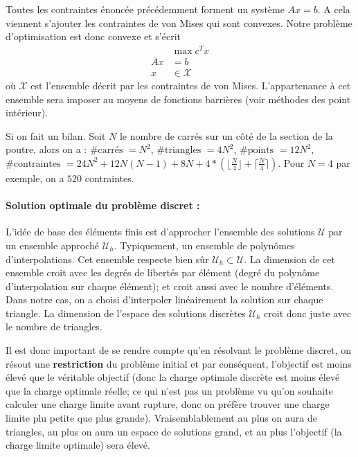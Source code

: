 Toutes les contraintes énoncée précédemment forment un système $Ax=b$. A cela viennent s'ajouter les contraintes de von Mises qui sont convexes. Notre problème d'optimisation est donc convexe et s'écrit 
\begin{align*}
& \max c^T x\\
 Ax &= b\\
 x & \in \mathcal{X}
\end{align*}
où $\mathcal{X}$ est l'ensemble décrit par les contraintes de von Mises. L'appartenance à cet ensemble sera imposer au moyens de fonctions barrières (voir méthodes des point intérieur). 

Si on fait un bilan. Soit $N$ le nombre de carrés sur un côté de la section de la poutre, alors on a : $\text{\# carrés  } = N^2$, $\text{\# triangles  } = 4N^2$, $\text{\# points  } = 12 N^2$, $\text{\# contraintes  } = 24N^2+12N(N-1)+8N + 4*\left(  \lfloor \frac{N}{4} \rfloor + \lceil \frac{N}{4} \rceil \right)$.
Pour $N=4$ par exemple, on a $520$ contraintes.

\paragraph{Solution optimale du problème discret : } L'idée de base des éléments finis est d'approcher l'ensemble des solutions $\mathcal{U}$ par un ensemble approché $\mathcal{U}_h$. Typiquement, un ensemble de polynômes d'interpolations. Cet ensemble respecte bien sûr $\mathcal{U}_h \subset \mathcal{U}$. La dimension de cet ensemble croit avec les degrés de libertés par élément (degré du polynôme d'interpolation sur chaque élément); et croit aussi avec le nombre d'éléments. Dans notre cas, on a choisi d'interpoler linéairement la solution sur chaque triangle. La dimension de l'espace des solutions discrètes $\mathcal{U}_h$ croit donc juste avec le nombre de triangles. 

Il est donc important de se rendre compte qu'en résolvant le problème discret, on résout une \textbf{restriction} du problème initial et par conséquent, l'objectif est moins élevé que le véritable objectif (donc la charge optimale discrète est moins élevé que la charge optimale réelle; ce qui n'est pas un problème vu qu'on souhaite calculer une charge limite avant rupture, donc on préfère trouver une charge limite plu petite que plus grande). Vraisemblablement au plus on aura de triangles, au plus on aura un espace de solutions grand, et au plus l'objectif (la charge limite optimale) sera élevé.

